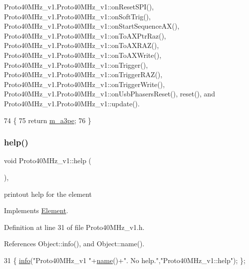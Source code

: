 Proto40\+M\+Hz\+\_\+v1.\+Proto40\+M\+Hz\+\_\+v1\+::on\+Reset\+S\+P\+I(), Proto40\+M\+Hz\+\_\+v1.\+Proto40\+M\+Hz\+\_\+v1\+::on\+Soft\+Trig(), Proto40\+M\+Hz\+\_\+v1.\+Proto40\+M\+Hz\+\_\+v1\+::on\+Start\+Sequence\+A\+X(), Proto40\+M\+Hz\+\_\+v1.\+Proto40\+M\+Hz\+\_\+v1\+::on\+To\+A\+X\+Ptr\+Raz(), Proto40\+M\+Hz\+\_\+v1.\+Proto40\+M\+Hz\+\_\+v1\+::on\+To\+A\+X\+R\+A\+Z(), Proto40\+M\+Hz\+\_\+v1.\+Proto40\+M\+Hz\+\_\+v1\+::on\+To\+A\+X\+Write(), Proto40\+M\+Hz\+\_\+v1.\+Proto40\+M\+Hz\+\_\+v1\+::on\+Trigger(), Proto40\+M\+Hz\+\_\+v1.\+Proto40\+M\+Hz\+\_\+v1\+::on\+Trigger\+R\+A\+Z(), Proto40\+M\+Hz\+\_\+v1.\+Proto40\+M\+Hz\+\_\+v1\+::on\+Trigger\+Write(), Proto40\+M\+Hz\+\_\+v1.\+Proto40\+M\+Hz\+\_\+v1\+::on\+Usb\+Phasers\+Reset(), reset(), and Proto40\+M\+Hz\+\_\+v1.\+Proto40\+M\+Hz\+\_\+v1\+::update().


\begin{DoxyCode}
74               \{
75     \textcolor{keywordflow}{return} \hyperlink{classProto40MHz__v1_a504389d91640776389db46797ca53909}{m\_a3pe};
76   \}
\end{DoxyCode}
\mbox{\label{classProto40MHz__v1_ae775987179848b4bc257473be261d24c}} 
\subsubsection{\texorpdfstring{help()}{help()}}
{\footnotesize\ttfamily void Proto40\+M\+Hz\+\_\+v1\+::help (\begin{DoxyParamCaption}{ }\end{DoxyParamCaption})\hspace{0.3cm}{\ttfamily [inline]}, {\ttfamily [virtual]}}

printout help for the element 

Implements \hyperlink{classElement_a32c0de27acb08e17251cef88c3e9303a}{Element}.



Definition at line 31 of file Proto40\+M\+Hz\+\_\+v1.\+h.



References Object\+::info(), and Object\+::name().


\begin{DoxyCode}
31 \{ \hyperlink{classObject_a644fd329ea4cb85f54fa6846484b84a8}{info}(\textcolor{stringliteral}{"Proto40MHz\_v1 "}+\hyperlink{classObject_a300f4c05dd468c7bb8b3c968868443c1}{name}()+\textcolor{stringliteral}{". No help."},\textcolor{stringliteral}{"Proto40MHz\_v1::help"}); \};
\end{DoxyCode}
\mbox{\label{classProto40MHz__v1_a60c96d57ae30bf6dcf9e4778294ca55c}} 
